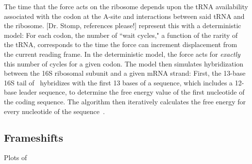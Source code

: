 \documentclass[12pt]{article}
\begin{document}
The time that the force acts on the ribosome depends upon
the tRNA availability associated with the codon at the A-site 
and interactions between said tRNA and the ribosome. [Dr. Stomp, references please!]
\citeauthor{lalit:mechanics} represent this with a deterministic model: For each codon,
the number of ``wait cycles," a function of the rarity of the
tRNA, corresponds to the time the force can
increment displacement from the current reading frame.  In the
deterministic model, the force acts for \emph{exactly} this number
of cycles for a given codon. The model then
simulates hybridization between the
16S ribosomal subunit and a given mRNA strand: First, the 13-base 16S
tail of \ecoli\ hybridizes with the first 13 bases of a sequence,
which includes a 12-base leader sequence, to determine the free energy 
value of the first nucleotide of the coding sequence. The algorithm then iteratively calculates
the free energy for every nucleotide of the sequence~\cite{starmer}.

\subsection{Frameshifts}
\label{section:frameshifts}

\begin{cfigure}
  \caption{Plots of~\prfB}
  \label{prfB:detplots}
\end{cfigure}
\end{document}
